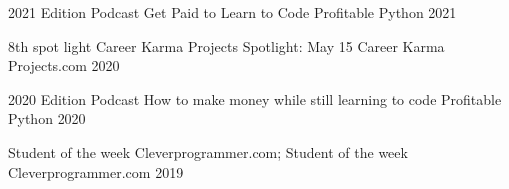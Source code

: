 



\begin{cvhonors}

  \cvhonor
    {2021 Edition Podcast} %
    {Get Paid to Learn to Code} %
    {Profitable Python} %
    {2021} %

  \cvhonor
    {8th spot light} %
    {Career Karma Projects Spotlight: May 15} %
    {Career Karma Projects.com}%
    {2020} %

  \cvhonor
    {2020 Edition Podcast} %
    {How to make money while still learning to code} %
    {Profitable Python} %
    {2020} %

  \cvhonor
    {Student of the week} %
    {Cleverprogrammer.com; Student of the week} %
    {Cleverprogrammer.com} %
    {2019} %

\end{cvhonors}


